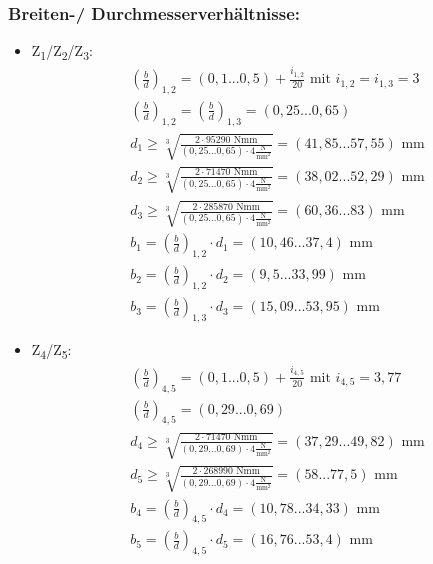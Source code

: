 \subsubsection{Breiten-/ Durchmesserverhältnisse:}
\begin{itemize}
\item {Z\textsubscript{1}/Z\textsubscript{2}/Z\textsubscript{3}:}
\begin{align*}
	& \left(\frac{b}{d} \right) _{1,2} = (0,1...0,5) + \frac{i_{1,2}}{20} \text{ mit } i_{1,2} = i_{1,3}= 3 \\
	&\left(\frac{b}{d} \right) _{1,2}= \left(\frac{b}{d} \right) _{1,3} = (0,25...0,65) \\
	&d_1 \ge \sqrt[3]{\frac{2 \cdot 95290 \text{ Nmm}}{(0,25...0,65) \cdot  4 \frac{\text{N}}{\text{mm}^2}}}= (41,85...57,55) \text{ mm}\\
	&d_2 \ge \sqrt[3]{\frac{2 \cdot 71470 \text{ Nmm}}{(0,25...0,65) \cdot  4 \frac{\text{N}}{\text{mm}^2}}}= (38,02...52,29) \text{ mm}  \\
	&d_3 \ge \sqrt[3]{\frac{2 \cdot 285870 \text{ Nmm}}{(0,25...0,65) \cdot  4 \frac{\text{N}}{\text{mm}^2}}}= (60,36...83) \text{ mm}\\
	&b_1= \left(\frac{b}{d} \right) _{1,2}  \cdot d_1 = (10,46...37,4) \text{ mm}  \\
	&b_2= \left(\frac{b}{d} \right) _{1,2}  \cdot d_2 = (9,5...33,99) \text{ mm}  \\
	&b_3= \left(\frac{b}{d} \right) _{1,3}  \cdot d_3 = (15,09...53,95) \text{ mm}  
\end{align*}
\item {Z\textsubscript{4}/Z\textsubscript{5}:}
\begin{align*}
	& \left(\frac{b}{d} \right) _{4,5} = (0,1...0,5) + \frac{i_{4,5}}{20} \text{ mit } i_{4,5} =  3,77 \\
	&\left(\frac{b}{d} \right) _{4,5}=  (0,29...0,69) \\
	&d_4 \ge \sqrt[3]{\frac{2 \cdot 71470 \text{ Nmm}}{(0,29...0,69) \cdot  4 \frac{\text{N}}{\text{mm}^2}}}= (37,29...49,82) \text{ mm}\\
	&d_5 \ge \sqrt[3]{\frac{2 \cdot 268990 \text{ Nmm}}{(0,29...0,69) \cdot  4 \frac{\text{N}}{\text{mm}^2}}}= (58...77,5) \text{ mm}  \\
	&b_4= \left(\frac{b}{d} \right) _{4,5}  \cdot d_4 = (10,78...34,33) \text{ mm}  \\
	&b_5= \left(\frac{b}{d} \right) _{4,5}  \cdot d_5 = (16,76...53,4) \text{ mm}  
\end{align*}

\end{itemize}
